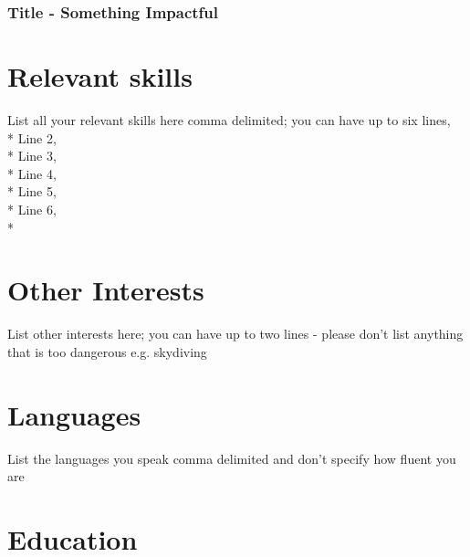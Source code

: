 \documentclass{brian_ats}
\begin{document}
\subsubsection{Title - Something Impactful}
\employmenthistory{}{}{}{}{}{}{}{}

\section{Relevant skills}
List all your relevant skills here comma delimited; you can have up to six lines,\\*
Line 2, \\*
Line 3, \\*
Line 4, \\*
Line 5, \\*
Line 6, \\*

\section{Other Interests}
List other interests here; you can have up to two lines - please don’t list anything that is too dangerous e.g. skydiving
\section{Languages}
List the languages you speak comma delimited and don’t specify how fluent you are
\section{Education}
\end{document}
